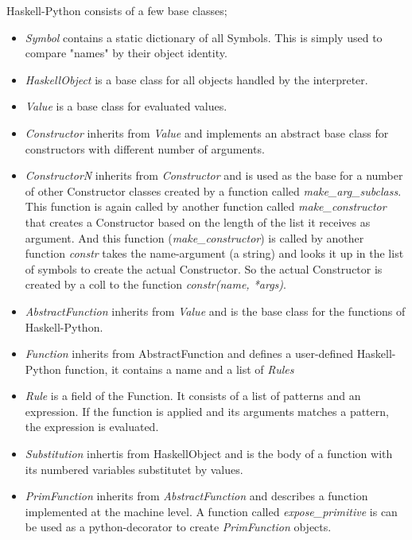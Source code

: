 Haskell-Python consists of a few base classes; 

\begin{itemize}

\item \emph{Symbol} contains a static dictionary of all Symbols. This is 
simply used to compare "names" by their object identity.

\item \emph{HaskellObject} is a base class for all objects handled by the
interpreter.

\item \emph{Value} is a base class for evaluated values.

\item \emph{Constructor} inherits from \emph{Value} and implements an abstract 
base class for constructors with different number of arguments.

\item \emph{ConstructorN} inherits from \emph{Constructor} and is used as the 
base for a number of other Constructor classes created by a function called 
\emph{make\_arg\_subclass}. This function is again called by another function
called \emph{make\_constructor} that creates a Constructor based on the length
of the list it receives as argument. And this function (\emph{make\_constructor})
is called by another function \emph{constr} takes the name-argument (a string)
and looks it up in the list of symbols to create the actual Constructor. So the
actual Constructor is created by a coll to the function \emph{constr(name, *args)}.

\item \emph{AbstractFunction} inherits from \emph{Value} and is the base class for 
the functions of Haskell-Python. 

\item \emph{Function} inherits from AbstractFunction and defines a user-defined 
Haskell-Python function, it contains a name and a list of \emph{Rules}

\item \emph{Rule} is a field of the Function. It consists of a list of patterns and
an expression. If the function is applied and its arguments matches a pattern, the
expression is evaluated.

\item \emph{Substitution} inhertis from HaskellObject and is the body of a function 
with its numbered variables substitutet by values.

\item \emph{PrimFunction} inherits from \emph{AbstractFunction} and describes a function
implemented at the machine level. A function called \emph{expose\_primitive} is
can be used as a python-decorator to create \emph{PrimFunction} objects.


\end{itemize}
